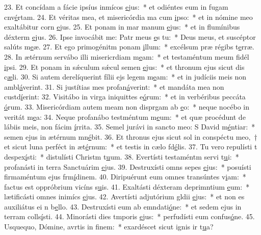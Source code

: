 23. Et concídam a fácie ipsíus inmícos \uline{e}jus:~* et odiéntes eum in fugam cnv\uline{é}rtam.
24. Et véritas mea, et misericórdia ma cum \uline{i}pso:~* et in nómine meo exaltábitur corn \uline{e}jus.
25. Et ponam in mar manum \uline{e}jus:~* et in flumínibus déxterm \uline{e}jus.
26. Ipse invocábit me: Patr meus \uline{e}s tu:~* Deus meus, et suscéptor salúts m\uline{e}æ.
27. Et ego primogénitm ponam \uline{i}llum:~* excélsum præ régibs t\uline{e}rræ.
28. In ætérnum servábo illi misericrdiam m\uline{e}am:~* et testaméntum meum fidél \uline{i}psi.
29. Et ponam in sǽculum sǽcul semen \uline{e}jus:~* et thronum ejus sicut dis c\uline{æ}li.
30. Si autem derelíquerint fílii ejs legem m\uline{e}am:~* et in judíciis meis non ambl\uline{á}verint.
31. Si justítias mes profan\uline{á}verint:~* et mandáta mea non custd\uline{í}erint:
32. Visitábo in virga iniquittes e\uline{ó}rum:~* et in verbéribus peccáta \uline{ó}rum.
33. Misericórdiam autem meam non disprgam ab \uline{e}o:~* neque nocébo in veritát m\uline{e}a:
34. Neque profanábo testméntum m\uline{e}um:~* et quæ procédunt de lábiis meis, non fácim \uline{í}rrita.
35. Semel jurávi in sancto meo: S David m\uline{é}ntiar:~* semen ejus in ætérnum mn\uline{é}bit.
36. Et thronus ejus sicut sol in conspéctu meo,~† et sicut luna perféct in æt\uline{é}rnum:~* et testis in cælo fd\uline{é}lis.
37. Tu vero repulísti t despex\uline{í}sti:~* distulísti Christm t\uline{u}um.
38. Evertísti testaméntm servi t\uline{u}i:~* profanásti in terra Sanctuárim \uline{e}jus.
39. Destruxísti omns sepes \uline{e}jus:~* posuísti firmaméntum ejus frm\uline{í}dinem.
40. Diripuérunt eum omnes transúntes v\uline{i}am:~* factus est oppróbrium vicíns s\uline{u}is.
41. Exaltásti déxteram deprimntium \uline{e}um:~* lætificásti omnes inimícs \uline{e}jus.
42. Avertísti adjutórium gldii \uline{e}jus:~* et non es auxiliátus ei n b\uline{e}llo.
43. Destruxísti eum ab emndati\uline{ó}ne:~* et sedem ejus in terram colls\uline{í}sti.
44. Minorásti dies tmporis \uline{e}jus:~* perfudísti eum confus\uline{ó}ne.
45. Usquequo, Dómine, avrtis in f\uline{i}nem:~* exardéscet sicut ignis ir t\uline{u}a?
